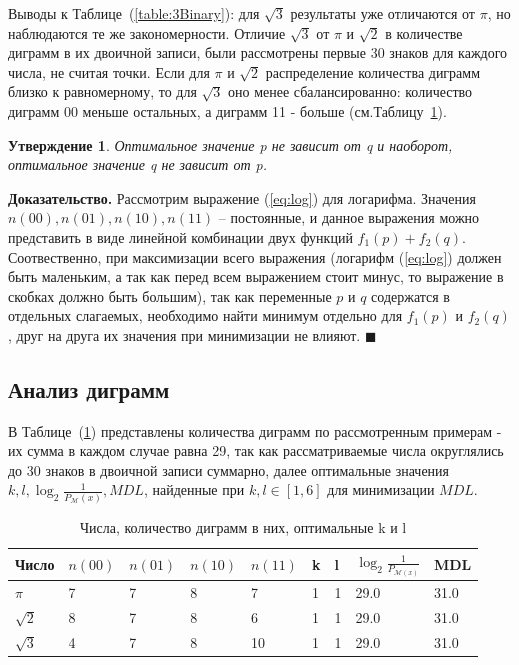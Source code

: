 \documentclass[12pt]{article}
\newtheorem{sttm}{Утверждение}
\newcommand{\qed}{\hfill $\blacksquare$}
\begin{document}
	Выводы к Таблице~(\ref{table:3Binary}): для $\sqrt{3}$ результаты уже отличаются от $\pi$, но наблюдаются те же закономерности. Отличие $\sqrt{3}$ от $\pi$ и $\sqrt{2}$ в количестве диграмм в их двоичной записи, были рассмотрены первые 30 знаков для каждого числа, не считая точки. Если для $\pi$ и $\sqrt{2}$ распределение количества диграмм близко к равномерному, то для $\sqrt{3}$ оно менее сбалансированно: количество диграмм 00 меньше остальных, а диграмм 11 - больше (см.Таблицу~\ref{table:digramsPi23}).
	
	\begin{sttm}\label{sttm:independence} Оптимальное значение p не зависит от q и наоборот, оптимальное значение q не зависит от p.
	\end{sttm}
	{\bf Доказательство.} Рассмотрим выражение (\ref{eq:log}) для логарифма. Значения $n(00), n(01), n(10), n(11)$ -- постоянные, и данное выражения можно представить в виде линейной комбинации двух функций $f_1(p)+f_2(q)$. Соотвественно, при максимизации всего выражения (логарифм (\ref{eq:log}) должен быть маленьким, а так как перед всем выражением стоит минус, то выражение в скобках должно быть большим), так как переменные $p$ и $q$ содержатся в отдельных слагаемых, необходимо найти минимум отдельно для $f_1(p)$ и $f_2(q)$, друг на друга их значения при минимизации не влияют. \qed
	
	\subsection*{Анализ диграмм}
	В Таблице~(\ref{table:digramsPi23}) представлены количества диграмм по рассмотренным примерам - их сумма в каждом случае равна 29, так как рассматриваемые числа округлялись до 30 знаков в двоичной записи суммарно, далее оптимальные значения $k,l,\log_2{\frac{1}{P_{\mathcal{M}}(x)}},MDL$, найденные при $k,l\in[1,6]$ для минимизации $MDL$.
	
	\begin{table}[!h]
		\caption{Числа, количество диграмм в них, оптимальные k и l}
		\label{table:digramsPi23}
		\begin{center}
			\begin{tabular}{|l|l|l|l|l|l|l|l|l|}
				\hline
				Число & $n(00)$ & $n(01)$ & $n(10)$ & $n(11)$ & k & l & $\log_2{\frac{1}{P_{\mathcal{M}(x)}}}$ & MDL \\
				\hline
				$\pi$ & 7 & 7 & 8 & 7 & 1 & 1 & 29.0 & 31.0\\
				\hline
				$\sqrt{2}$ & 8 & 7 & 8 & 6 & 1 & 1 & 29.0 & 31.0\\
				\hline
				$\sqrt{3}$ & 4 & 7 & 8 & 10 & 1 & 1 & 29.0 & 31.0\\
				\hline
			\end{tabular}
		\end{center}
	\end{table}
	
\end{document}
